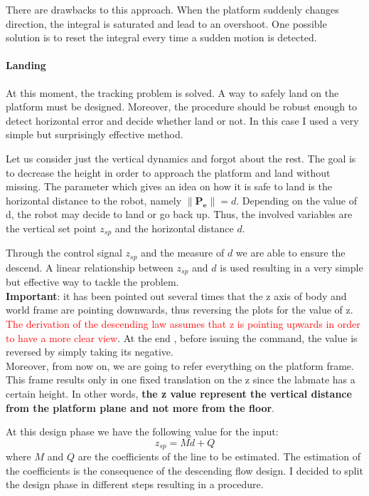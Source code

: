 There are drawbacks to this approach. When the platform suddenly changes direction, the integral is saturated and lead to an overshoot. One possible solution is to reset the integral every time a sudden motion is detected.

\paragraph{Landing}

At this moment, the tracking problem is solved. A way to safely land on the platform must be designed. Moreover, the procedure should be robust enough to detect horizontal error and decide whether land or not. In this case I used a very simple but surprisingly effective method. 

Let us consider just the vertical dynamics and forgot about the rest. The goal is to decrease the height in order to approach the platform and land without missing. The parameter which gives an idea on how it is safe to land is the horizontal distance to the robot, namely $\lVert \boldsymbol{P_e} \rVert = d$. Depending on the value of d, the robot may decide to land or go back up. Thus, the involved variables are the vertical set point $z_{sp}$ and the horizontal distance $d$. 

Through the control signal $z_{sp}$ and the measure of $d$ we are able to ensure the descend. A linear relationship between $z_{sp}$ and $d$ is used resulting in a very simple but effective way to tackle the problem.\\

\noindent
\textbf{Important}: it has been pointed out several times that the z axis of body and world frame are pointing downwards, thus reversing the plots for the value of z. \textcolor{red}{The derivation of the descending law assumes that z is pointing upwards in order to have a more clear view}. At the end , before issuing the command, the value is reversed by simply taking its negative. \\

\noindent
Moreover, from now on, we are going to refer everything on the platform frame. This frame results only in one fixed translation on the z since the labmate has a certain height. In other words, \textbf{the z value represent the vertical distance from the platform plane and not more from the floor}. 

At this design phase we have the following value for the input:
\begin{equation}
	z_{sp} = M d + Q
	\label{eq:line}
\end{equation}
where $M$ and $Q$ are the coefficients of the line to be estimated. The estimation of the coefficients is the consequence of the descending flow design. I decided to split the design phase in different steps resulting in a procedure. 

